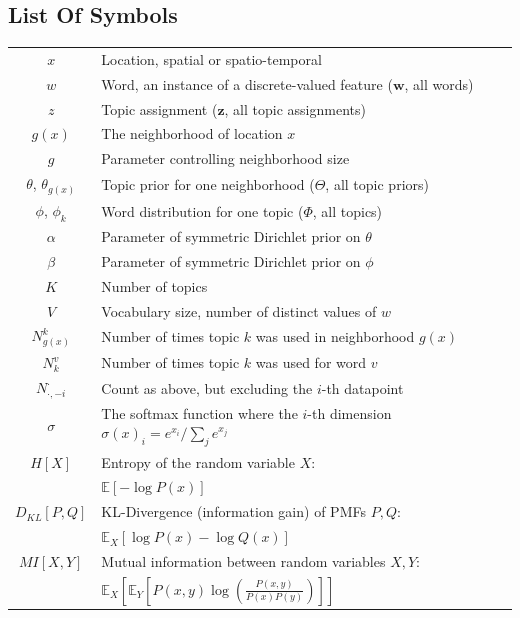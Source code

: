 
\begin{appendices}
\chapter{List Of Symbols}
\begin{tabular}{cp{\textwidth}}
  $x$ & Location, spatial or spatio-temporal \\
  $w$ & Word, an instance of a discrete-valued feature ($\textbf{w}$, all words) \\
  $z$ & Topic assignment ($\textbf{z}$, all topic assignments) \\
  $g(x)$ & The neighborhood of location $x$ \\
  $g$ & Parameter controlling neighborhood size \\
  $\theta$, $\theta_{g(x)}$ & Topic prior for one neighborhood ($\Theta$, all topic priors)\\
  $\phi$, $\phi_k$ & Word distribution for one topic ($\Phi$, all topics) \\
  $\alpha$ & Parameter of symmetric Dirichlet prior on $\theta$ \\
  $\beta$ & Parameter of symmetric Dirichlet prior on $\phi$ \\
  $K$ & Number of topics \\
  $V$ & Vocabulary size, number of distinct values of $w$ \\
  $N_{g(x)}^k$ & Number of times topic $k$ was used in neighborhood $g(x)$ \\
  $N_k^v$ & Number of times topic $k$ was used for word $v$ \\
  $N_{\cdot,-i}^\cdot$ & Count as above, but excluding the $i$-th datapoint\\
  $\sigma$ & The softmax function where the $i$-th dimension $\sigma(x)_i = {e^{x_i}} / \sum_j e^{x_j}$ \\
  $H[X]$ & Entropy of the random variable $X$: \\
         & $\mathbb{E}[-\log P(x)]$ \\
  $D_{KL}[P,Q]$ & KL-Divergence (information gain) of PMFs $P, Q$:\\
         & $\mathbb{E}_X \left[\log P(x) - \log Q(x) \right]$ \\
  $MI[X,Y]$ & Mutual information between random variables $X, Y$:\\
         & $\mathbb{E}_X \left[\mathbb{E}_Y \left[P(x,y) \log\left(\frac{P(x,y)}{P(x)P(y)}\right) \right] \right]$
\end{tabular}\\


\end{appendices}
